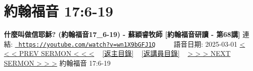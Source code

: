\documentclass{book}
\begin{document}
\section{約翰福音 17:6-19}
\label{sec:wn1X9bGFJ1Q}
\textbf{什麼叫做信耶穌? (約翰福音17\_6-19) - 蘇穎睿牧師 [約翰福音研讀 - 第68講]}
\newline
\newline
連結: \href{https://youtube.com/watch?v=wn1X9bGFJ1Q}{\texttt{ https://youtube.com/watch?v=wn1X9bGFJ1Q}} ~~~~ 語音日期: 2025-03-01 
\newline
\newline
\hyperref[sec:wiDRWRXrtjM]{< < < PREV SERMON < < <}
~
\hyperlink{toc}{[返主目錄]}
~
\hyperref[ch:preacher9]{[返講員目錄]}
~
\hyperref[sec:cPwA4cZWWYs]{> > > NEXT SERMON > > >}
\newline
\newline
約翰福音 17:6-19
\newline
\end{document}
